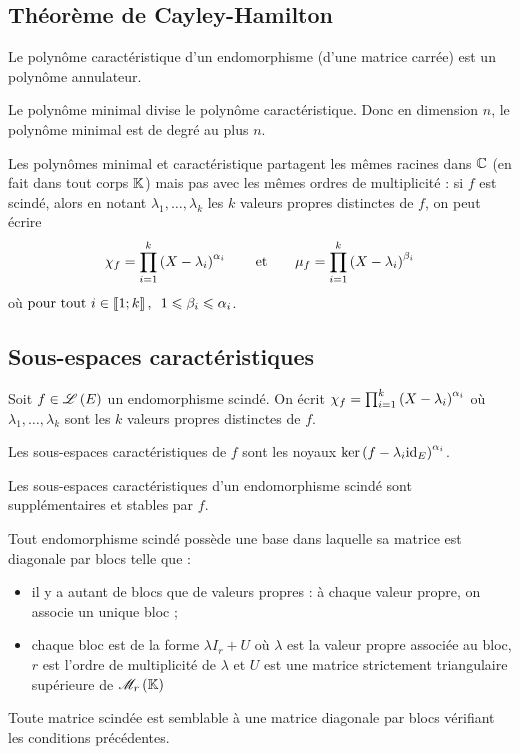 \subsection{Théorème de Cayley-Hamilton}

\begin{theo}
Le polynôme caractéristique d'un endomorphisme (d'une matrice carrée) est un polynôme annulateur.
\end{theo}

\begin{cor}
Le polynôme minimal divise le polynôme caractéristique. Donc en dimension \(n\), le polynôme minimal est de degré au plus \(n\).
\end{cor}

Les polynômes minimal et caractéristique partagent les mêmes racines dans \(\mathbb{C}\) (en fait dans tout corps \(\mathbb{K}\)) mais pas avec les mêmes ordres de multiplicité : si \(f\) est scindé, alors en notant \(\lambda_1,\dots,\lambda_k\) les \(k\) valeurs propres distinctes de \(f\), on peut écrire \[\chi_f=\prod_{i=1}^k\left(X-\lambda_i\right)^{\alpha_i}\qquad\text{et}\qquad\mu_f=\prod_{i=1}^k\left(X-\lambda_i\right)^{\beta_i}\] où \(\quantifs{\tpt i\in\interventierii{1}{k}}1\leq\beta_i\leq\alpha_i\).

\subsection{Sous-espaces caractéristiques}

\begin{defi}
Soit \(f\in\mathscr{L}\left(E\right)\) un endomorphisme scindé. On écrit \(\chi_f=\prod_{i=1}^k\left(X-\lambda_i\right)^{\alpha_i}\) où \(\lambda_1,\dots,\lambda_k\) sont les \(k\) valeurs propres distinctes de \(f\).

Les sous-espaces caractéristiques de \(f\) sont les noyaux \(\ker\left(f-\lambda_i\mathrm{id}_{E}\right)^{\alpha_i}\).
\end{defi}

\begin{prop}
Les sous-espaces caractéristiques d'un endomorphisme scindé sont supplémentaires et stables par \(f\).
\end{prop}

\begin{theo}
Tout endomorphisme scindé possède une base dans laquelle sa matrice est diagonale par blocs telle que :

\begin{itemize}
    \item il y a autant de blocs que de valeurs propres : à chaque valeur propre, on associe un unique bloc ; \\
    \item chaque bloc est de la forme \(\lambda I_r+U\) où \(\lambda\) est la valeur propre associée au bloc, \(r\) est l'ordre de multiplicité de \(\lambda\) et \(U\) est une matrice strictement triangulaire supérieure de \(\M{r}\)
\end{itemize}

Toute matrice scindée est semblable à une matrice diagonale par blocs vérifiant les conditions précédentes.
\end{theo}


